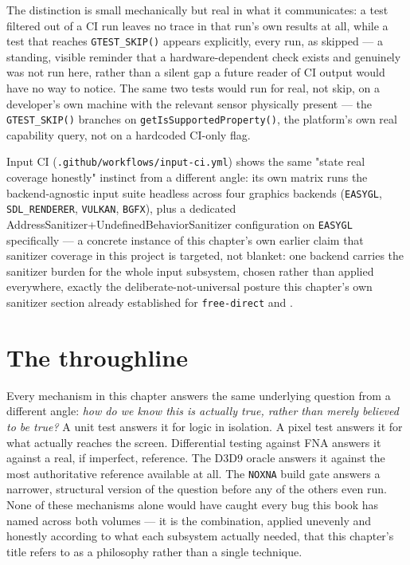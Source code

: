The distinction is small mechanically but real in what it communicates: a test filtered out of
a CI run leaves no trace in that run's own results at all, while a test that reaches
\texttt{GTEST\_SKIP()} appears explicitly, every run, as skipped --- a standing, visible
reminder that a hardware-dependent check exists and genuinely was not run here, rather than a
silent gap a future reader of CI output would have no way to notice. The same two tests would
run for real, not skip, on a developer's own machine with the relevant sensor physically
present --- the \texttt{GTEST\_SKIP()} branches on \texttt{getIsSupportedProperty()}, the
platform's own real capability query, not on a hardcoded CI-only flag.

Input CI (\texttt{.github/workflows/input-ci.yml}) shows the same "state real coverage
honestly" instinct from a different angle: its own matrix runs the backend-agnostic input
suite headless across four graphics backends (\texttt{EASYGL}, \texttt{SDL\_RENDERER},
\texttt{VULKAN}, \texttt{BGFX}), plus a dedicated AddressSanitizer+UndefinedBehaviorSanitizer
configuration on \texttt{EASYGL} specifically --- a concrete instance of this chapter's own
earlier claim that sanitizer coverage in this project is targeted, not blanket: one backend
carries the sanitizer burden for the whole input subsystem, chosen rather than applied
everywhere, exactly the deliberate-not-universal posture this chapter's own sanitizer section
already established for \texttt{free-direct} and .

\section{The throughline}

Every mechanism in this chapter answers the same underlying question from a different angle:
\emph{how do we know this is actually true, rather than merely believed to be true?} A unit
test answers it for logic in isolation. A pixel test answers it for what actually reaches the
screen. Differential testing against FNA answers it against a real, if imperfect, reference.
The D3D9 oracle answers it against the most authoritative reference available at all. The
\texttt{NOXNA} build gate answers a narrower, structural version of the question before any
of the others even run. None of these mechanisms alone would have caught every bug this book
has named across both volumes --- it is the combination, applied unevenly and honestly
according to what each subsystem actually needed, that this chapter's title refers to as a
philosophy rather than a single technique.
